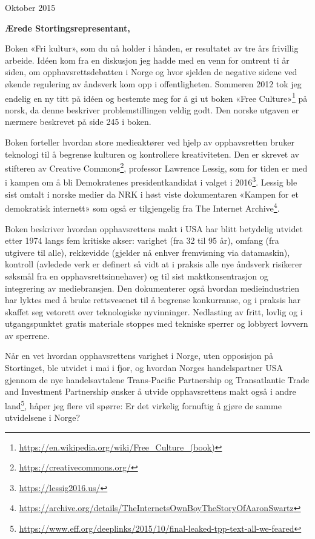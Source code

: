 \documentclass[a4paper, 11pt, norsk]{article}
\begin{document}
\begin{flushright} Oktober 2015 \end{flushright}

{\bf Ærede Stortingsrepresentant,}

Boken «Fri kultur», som du nå holder i hånden, er resultatet av tre
års frivillig arbeide.  Idéen kom fra en diskusjon jeg hadde med en
venn for omtrent ti år siden, om opphavsrettsdebatten i Norge og hvor
sjelden de negative sidene ved økende regulering av åndsverk kom opp i
offentligheten.  Sommeren 2012 tok jeg endelig en ny titt på idéen og
bestemte meg for å gi ut boken «Free
  Culture»\footnote{\url{https://en.wikipedia.org/wiki/Free_Culture_(book)}}
på norsk, da denne beskriver problemstillingen veldig godt.  Den
norske utgaven er nærmere beskrevet på side 245 i boken.

Boken forteller hvordan store medieaktører ved hjelp av opphavsretten
bruker teknologi til å begrense kulturen og kontrollere kreativiteten.
Den er skrevet av stifteren av Creative
Commons\footnote{\url{https://creativecommons.org/}}, professor
Lawrence Lessig, som for tiden er med i kampen om å bli Demokratenes
presidentkandidat i valget i
2016\footnote{\url{https://lessig2016.us/}}.  Lessig ble sist omtalt i
norske medier da NRK i høst viste dokumentaren «Kampen for et
  demokratisk internett» som også er tilgjengelig fra The Internet
Archive\footnote{\url{https://archive.org/details/TheInternetsOwnBoyTheStoryOfAaronSwartz}}.

Boken beskriver hvordan opphavsrettens makt i USA har blitt betydelig
utvidet etter 1974 langs fem kritiske akser: varighet (fra 32 til 95
år), omfang (fra utgivere til alle), rekkevidde (gjelder nå enhver
fremvisning via datamaskin), kontroll (avledede verk er definert så
vidt at i praksis alle nye åndsverk risikerer søksmål fra en
opphavsrettsinnehaver) og til sist maktkonsentrasjon og integrering av
mediebransjen.  Den dokumenterer også hvordan medieindustrien har
lyktes med å bruke rettsvesenet til å begrense konkurranse, og i
praksis har skaffet seg vetorett over teknologiske nyvinninger.
Nedlasting av fritt, lovlig og i utgangspunktet gratis materiale
stoppes med tekniske sperrer og lobbyert lovvern av sperrene.

Når en vet hvordan opphavsrettens varighet i Norge, uten opposisjon på
Stortinget, ble utvidet i mai i fjor, og hvordan Norges handelspartner
USA gjennom de nye handelsavtalene Trans-Pacific Partnership og
Transatlantic Trade and Investment Partnership ønsker å utvide
opphavsrettens makt også i andre
land\footnote{\url{https://www.eff.org/deeplinks/2015/10/final-leaked-tpp-text-all-we-feared}},
håper jeg flere vil spørre: Er det virkelig fornuftig å gjøre de samme
utvidelsene i Norge?
\end{document}
